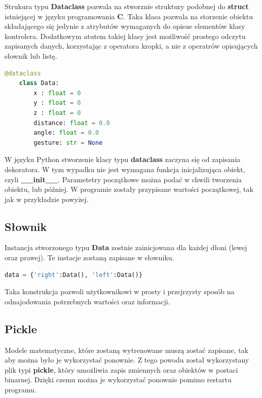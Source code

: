 \quad Strukura typu \textbf{Dataclass} pozwala na stworznie struktury podobnej do \textbf{struct} istniejącej w języku programowania \textbf{C}. Taka klasa pozwala na storzenie obiektu składającego się jedynie z atrybutów wymaganych do opisue elementów klasy kontrolera. Dodatkowym atutem takiej klasy jest możliwość prostego odczytu zapisanych danych, korzystając z operatora kropki, a nie z operatrów opisujących słownik lub listę. 

\begin{lstlisting}[language=python, style=programming]
    @dataclass
    class Data:
        x : float = 0
        y : float = 0
        z : float = 0
        distance: float = 0.0
        angle: float = 0.0
        gesture: str = None
\end{lstlisting}

\quad W języku Python stworzenie klasy typu \textbf{dataclass} zaczyna się od zapisania dekoratora. W tym wypadku nie jest wymagana funkcja inicjalizująca obiekt, czyli \textbf{\_\_init\_\_}. Parametetry początkowe można podać w chwili tworzenia obiektu, lub później. W programie zostały przypisane wartości początkowej, tak jak w przykładzie powyżej. 

\subsection{Słownik}

\quad Instancja stworzonego typu \textbf{Data} zostnie zainicjowana dla każdej dłoni (lewej oraz prawej). Te instacje zostaną zapisane w słowniku. 

\begin{lstlisting}[language=python, style=programming]
    data = {'right':Data(), 'left':Data()}
\end{lstlisting}

\quad Taka konstrukcja pozwoli użytkownikowi w prosty i przejrzysty sposób na odnajodowania potrzebnych wartości oraz informacji. 

\subsection{Pickle}
\quad Modele matematyczne, które zostaną wytrenowane muszą zostać zapisane, tak aby można było je wykorzystać ponownie. Z tego powodu został wykorzystany plik typi \textbf{pickle}, który umożliwia zapis zmiennych oraz obiektów w postaci binarnej. Dzięki czemu można je wykorzystać ponownie pomimo restartu programu. 

